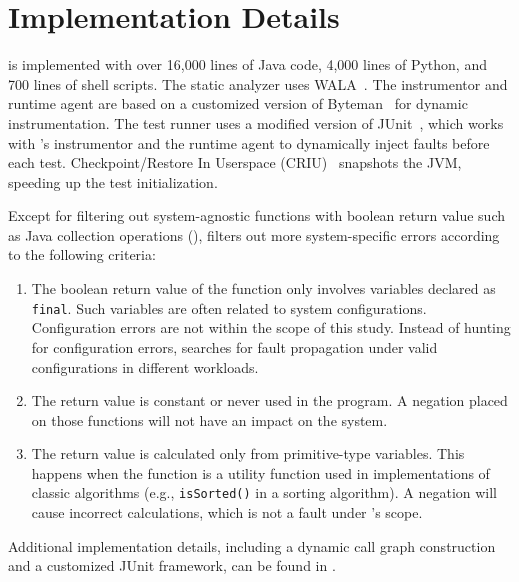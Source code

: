 \section{Implementation Details}
\label{sec:impl-detail}

\tool is implemented with over 16,000 lines of Java code, 4,000 lines of Python, and 700 lines of shell scripts. The static analyzer uses WALA~\cite{wala}. The instrumentor and runtime agent are based on a customized version of Byteman~\cite{byteman} for dynamic instrumentation. The test runner uses a modified version of JUnit~\cite{junit}, which works with \tool's instrumentor and the runtime agent to dynamically inject faults before each test. Checkpoint/Restore In Userspace (CRIU)~\cite{criu} snapshots the JVM, speeding up the test initialization.

Except for filtering out 
system-agnostic functions with boolean return value such as Java collection operations 
(), 
\tool filters out more system-specific errors 
according to the following criteria: 

\begin{enumerate}[wide, labelwidth=!, labelindent=\parindent, noitemsep, topsep=0pt]

\item The boolean return value of the function only involves variables declared as \texttt{final}. 
Such variables are often related to system configurations. 
Configuration errors are not within the scope of this study. 
Instead of hunting for configuration errors, 
\tool searches for fault propagation 
under valid configurations in different workloads. 

\item The return value is constant or never used in the program. 
A negation placed on those functions will not have an impact on the system.

\item The return value is calculated only from primitive-type variables. 
This happens when the function is a utility function 
used in 
implementations of classic algorithms (e.g., \texttt{isSorted()} in a sorting algorithm). 
A negation will cause incorrect calculations, which is not a fault under \tool's scope.
\end{enumerate}

Additional implementation details, 
including a dynamic call graph construction 
and a customized JUnit framework, 
can be found in .


